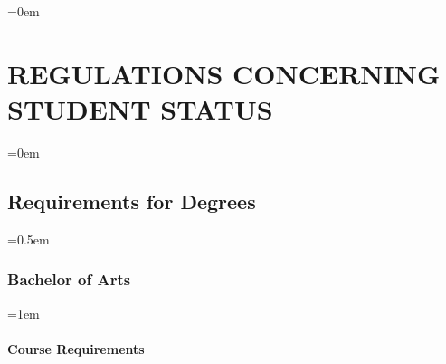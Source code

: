 \documentclass{manual}
\let\stdsection\section %
\renewcommand\section{\newpage\stdsection}
\let\oldsection\section
\renewcommand\section{\leftskip=0em\oldsection}
\let\oldsubsection\subsection
\renewcommand\subsection{\leftskip=0em\oldsubsection}
\let\oldsubsubsection\subsubsection
\renewcommand\subsubsection{\leftskip=0.5em\oldsubsubsection}
\let\oldparagraph\paragraph
\renewcommand\paragraph{\leftskip=1em\oldparagraph}
\begin{document}
\section{REGULATIONS CONCERNING STUDENT STATUS}\label{art:RegulationsConcerningStudentStatus}

\subsection{Requirements for Degrees}

\subsubsection{Bachelor of Arts}

\paragraph{Course Requirements}
\end{document}
